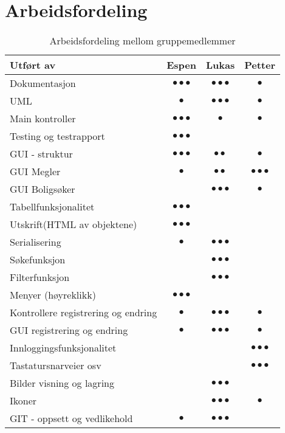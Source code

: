 \newpage
\section{Arbeidsfordeling}

\begin{table}[ht!]
\center
\caption{Arbeidsfordeling mellom gruppemedlemmer}
\label{tab:arbeidsfordeling}
\begin{tabular}{|p{6.8cm}|c|c|c|}

\hline
\textbf{Utført av}							&\textbf{Espen}				&\textbf{Lukas}				&\textbf{Petter}\\ \hline
Dokumentasjon								&$\bullet\bullet\bullet$	&$\bullet\bullet\bullet$	&$\bullet$\\	\hline
UML											&$\bullet$					&$\bullet\bullet\bullet$	&$\bullet$\\ \hline
Main kontroller								&$\bullet\bullet\bullet$	&$\bullet$					&$\bullet$\\ \hline
Testing og testrapport						&$\bullet\bullet\bullet$&& \\ \hline
GUI - struktur								&$\bullet\bullet\bullet$	&$\bullet\bullet$			&$\bullet$\\ \hline
GUI Megler									&$\bullet$					&$\bullet\bullet$			&$\bullet\bullet\bullet$\\ \hline
GUI Boligsøker								&							&$\bullet\bullet\bullet$	&$\bullet$\\ \hline
Tabellfunksjonalitet						&$\bullet\bullet\bullet$	&							&\\ \hline
Utskrift(HTML av objektene)				&$\bullet\bullet\bullet$	&							&\\ \hline
Serialisering								&$\bullet$					&$\bullet\bullet\bullet$	&\\ \hline
Søkefunksjon								&							&$\bullet\bullet\bullet$	&\\ \hline
Filterfunksjon								&							&$\bullet\bullet\bullet$	&\\ \hline
Menyer (høyreklikk)							&$\bullet\bullet\bullet$	&							&\\ \hline
Kontrollere registrering og endring		&$\bullet$					&$\bullet\bullet\bullet$ 	&$\bullet$\\ \hline
GUI registrering og endring				&$\bullet$					&$\bullet\bullet\bullet$ 	&$\bullet$\\ \hline
Innloggingsfunksjonalitet					&							&							&$\bullet\bullet\bullet$\\ \hline
Tastatursnarveier osv						&							&							&$\bullet\bullet\bullet$\\ \hline
Bilder visning og lagring					&							&$\bullet\bullet\bullet$	&\\ \hline
Ikoner										&							&$\bullet\bullet\bullet$	&$\bullet$\\ \hline
GIT - oppsett og vedlikehold				&$\bullet$					&$\bullet\bullet\bullet$	&\\ \hline

\hline
\end{tabular}
\end{table}